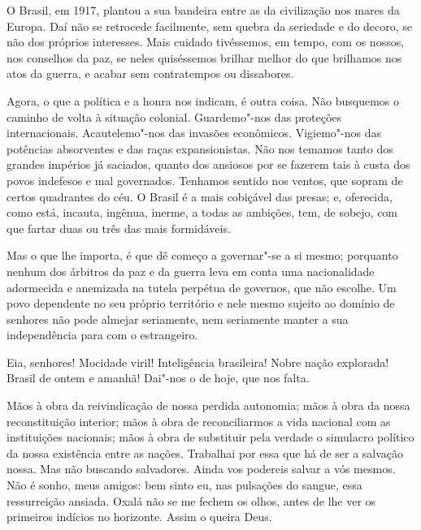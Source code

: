O Brasil, em 1917, plantou a sua bandeira entre as da civilização
nos mares da Europa. Daí não se retrocede facilmente, sem quebra da
seriedade e do decoro, se não dos próprios interesses. Mais cuidado
tivéssemos, em tempo, com os nossos, nos conselhos da paz, se neles
quiséssemos brilhar melhor do que brilhamos nos atos da guerra, e
acabar sem contratempos ou dissabores.

Agora, o que a política e a honra nos indicam, é outra coisa. Não
busquemos o caminho de volta à situação colonial. Guardemo"-nos das
proteções internacionais. Acautelemo"-nos das invasões econômicos.
Vigiemo"-nos das potências absorventes e das raças expansionistas. Não
nos temamos tanto dos grandes impérios já saciados, quanto dos ansiosos
por se fazerem tais à custa dos povos indefesos e mal governados.
Tenhamos sentido nos ventos, que sopram de certos quadrantes do céu. O
Brasil é a mais cobiçável das presas; e, oferecida, como está, incauta,
ingênua, inerme, a todas as ambições, tem, de sobejo, com que fartar
duas ou três das mais formidáveis.

Mas o que lhe importa, é que dê começo a governar"-se a si mesmo;
porquanto nenhum dos árbitros da paz e da guerra leva em conta uma
nacionalidade adormecida e anemizada na tutela perpétua de governos,
que não escolhe. Um povo dependente no seu próprio território e nele
mesmo sujeito ao domínio de senhores não pode almejar seriamente, nem
seriamente manter a sua independência para com o estrangeiro.

Eia, senhores! Mocidade viril! Inteligência brasileira! Nobre
nação explorada! Brasil de ontem e amanhã! Dai"-nos o de hoje, que nos falta.

Mãos à obra da reivindicação de nossa perdida autonomia; mãos à
obra da nossa reconstituição interior; mãos à obra de reconciliarmos a
vida nacional com as instituições nacionais; mãos à obra de substituir
pela verdade o simulacro político da nossa existência entre as nações.
Trabalhai por essa que há de ser a salvação nossa. Mas não buscando
salvadores. Ainda vos podereis salvar a vós mesmos. Não é sonho, meus
amigos: bem sinto eu, nas pulsações do sangue, essa ressurreição
ansiada. Oxalá não se me fechem os olhos, antes de lhe ver os primeiros
indícios no horizonte. Assim o queira Deus.

\endgroup